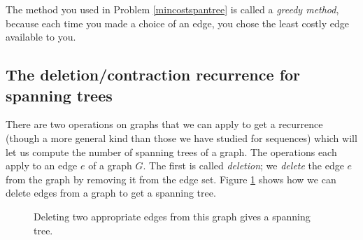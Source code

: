 The method you used in Problem \ref{mincostspantree} is called a {\em
greedy method}, because each time you made a choice of
an edge, you chose the least costly edge available to you.

\subsection{The deletion/contraction recurrence for spanning trees} 

There are two operations on graphs that we can apply to get a
recurrence (though a more general kind than those we have studied for
sequences) which will let us compute the number of spanning trees of a
graph.  The operations each apply to an edge $e$ of a graph $G$.  
The first is called {\em deletion}; we {\em delete} the
edge
$e$ from the graph by removing it from the edge set.  Figure
\ref{twodeletions} shows how we can delete edges from a graph to get a
spanning tree.
\begin{figure}[htb]\caption{Deleting
two appropriate edges from this graph gives a spanning
tree.}\label{twodeletions}
\begin{center}\mbox{}
\end{center}\end{figure}


